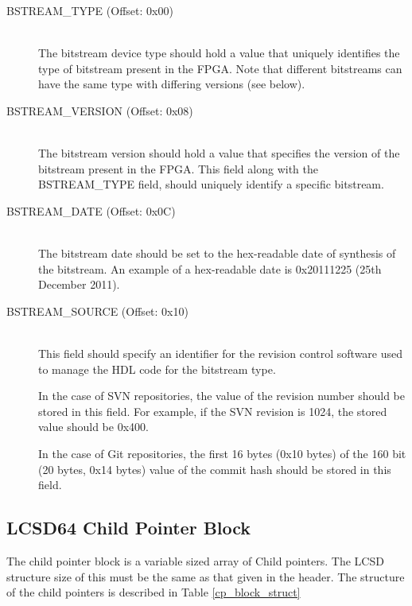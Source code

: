 \documentclass[a4paper, 12pt]{article}
\begin{document}
\begin{description}
\item[BSTREAM\_TYPE (Offset: 0x00)] \hfill \\
The bitstream device type should hold a value that uniquely identifies the type of 
bitstream present in the FPGA. Note that different bitstreams can have the
same type with differing versions (see below).

\item[BSTREAM\_VERSION (Offset: 0x08)] \hfill \\
The bitstream version should hold a value that specifies the version of the
bitstream present in the FPGA. This field along with the BSTREAM\_TYPE field,
should uniquely identify a specific bitstream.

\item[BSTREAM\_DATE (Offset: 0x0C)] \hfill \\
The bitstream date should be set to the hex-readable date of synthesis of
the bitstream. An example of a hex-readable date is 0x20111225 (25th December
2011).

\item[BSTREAM\_SOURCE (Offset: 0x10)] \hfill \\
This field should specify an identifier for the revision control software
used to manage the HDL code for the bitstream type.

In the case of SVN repositories, the value of the revision number should
be stored in this field. For example, if the SVN revision is 1024, the 
stored value should be 0x400.

In the case of Git repositories, the first 16 bytes (0x10 bytes) of the
160 bit (20 bytes, 0x14 bytes) value of the commit hash should be stored
in this field.

\end{description}

\subsection{LCSD64 Child Pointer Block}\label{cp_block}

The child pointer block is a variable sized array of Child pointers. The LCSD
structure size of this must be the same as that given in the header.
The structure of the child pointers is described in Table \ref{cp_block_struct}
\end{document}
